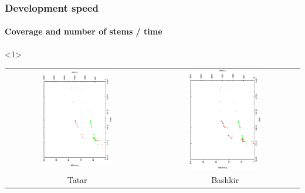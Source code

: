 \documentclass[10pt,xetex]{beamer} %
\begin{document}
\begin{frame}[fragile]
  \frametitle{Development speed}
  \framesubtitle{Coverage and number of stems / time}

\begin{onlyenv}<1>
\begin{center}

\begin{tabular}{cc}
\includegraphics[angle=270,width=0.5\textwidth]{hist-tt-dec.ps} &  \includegraphics[angle=270,width=0.5\textwidth]{hist-ba-dec.ps} \\
Tatar & Bashkir \\
\end{tabular}


\end{center}
\end{onlyenv}
\end{frame}
\end{document}
